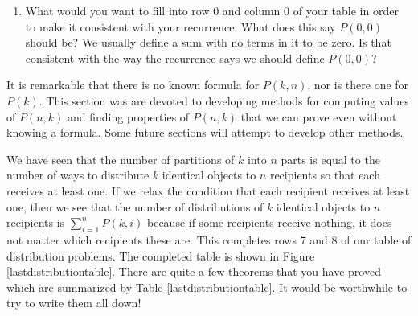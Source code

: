{\begin{enumerate}
\item What would you want to fill
into row 0 and column 0 of your table in order to make it consistent with
your recurrence.  What does this say $P(0,0)$ should be?  We usually
define a sum with no terms in it to be zero. Is that consistent with the
way the recurrence says we should define $P(0,0)$?
\end{enumerate}
\ep 
It is remarkable that
there is no known formula for $P(k,n)$, nor is there one for $P(k)$.  This
section was are devoted to developing
methods for computing values of $P(n,k)$ and finding properties of
$P(n,k)$ that we can prove even without knowing a formula.  Some future
sections will attempt to develop other methods.

We have seen that the number of partitions of $k$ into $n$ parts is equal
to the number of ways to distribute $k$ identical objects to $n$
recipients so that each receives at least one.  If we relax the condition
that each recipient receives at least one, then we see that the number of
distributions of $k$ identical objects to $n$ recipients is $\sum_{i=1}^n
P(k,i)$ because if some recipients receive nothing, it does not matter
which recipients these are.  This completes rows 7 and 8 of our table of
distribution problems.  The completed table is shown in Figure
\ref{lastdistributiontable}.  There are quite a few theorems that you
have proved which are summarized by Table \ref{lastdistributiontable}. 
It would be worthwhile to try to write them all down!


}
